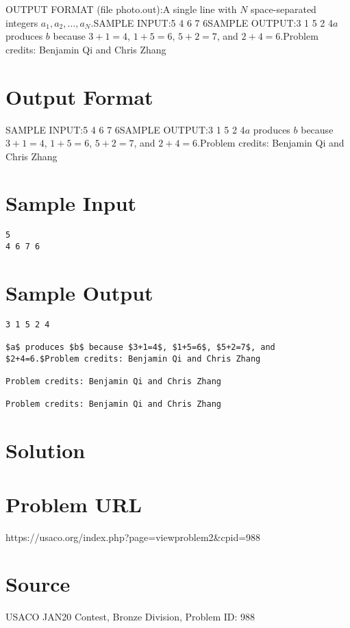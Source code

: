 \documentclass[12pt]{article}
\begin{document}
OUTPUT FORMAT (file photo.out):A single line with $N$ space-separated integers $a_1,a_2,\ldots,a_{N}.$SAMPLE INPUT:5
4 6 7 6SAMPLE OUTPUT:3 1 5 2 4$a$ produces $b$ because $3+1=4$, $1+5=6$, $5+2=7$, and $2+4=6.$Problem credits: Benjamin Qi and Chris Zhang

\section*{Output Format}
SAMPLE INPUT:5
4 6 7 6SAMPLE OUTPUT:3 1 5 2 4$a$ produces $b$ because $3+1=4$, $1+5=6$, $5+2=7$, and $2+4=6.$Problem credits: Benjamin Qi and Chris Zhang

\section*{Sample Input}
\begin{verbatim}
5
4 6 7 6
\end{verbatim}

\section*{Sample Output}
\begin{verbatim}
3 1 5 2 4

$a$ produces $b$ because $3+1=4$, $1+5=6$, $5+2=7$, and $2+4=6.$Problem credits: Benjamin Qi and Chris Zhang

Problem credits: Benjamin Qi and Chris Zhang

Problem credits: Benjamin Qi and Chris Zhang
\end{verbatim}

\section*{Solution}


\section*{Problem URL}
https://usaco.org/index.php?page=viewproblem2&cpid=988

\section*{Source}
USACO JAN20 Contest, Bronze Division, Problem ID: 988
\end{document}
